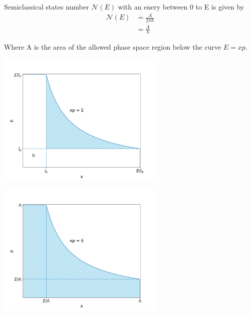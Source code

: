 \documentclass[12pt, letterpaper]{article}
\newcommand*{\1}{\hspace{1pt}}
\begin{document}
    Semiclassical states number $\mathcal {N}(E)$ with an enery between 0 to E is given by
    \begin{equation}
        \begin{split}
            \mathcal {N}(E) &= \frac{A}{2 \pi \hbar} \\
            &= \frac{A}{h}
        \end{split}
    \end{equation}

    Where A is the area of the allowed phase space region below the curve $E = xp$.

    \begin{mdframed}[hidealllines=true,backgroundcolor=blue!20]
    \begin{adjustbox}{center,caption={Berry-Keating Regularization},label={microcanocnial OTOC},nofloat=figure,}
        \includegraphics[width=0.6\textwidth]{pic4}
    \end{adjustbox}

    \begin{adjustbox}{center,caption={Connes Regularization},label={microcanocnial OTOC},nofloat=figure,}
        \includegraphics[width=0.6\textwidth]{pic3}
    \end{adjustbox}
    \end{mdframed}
\end{document}
